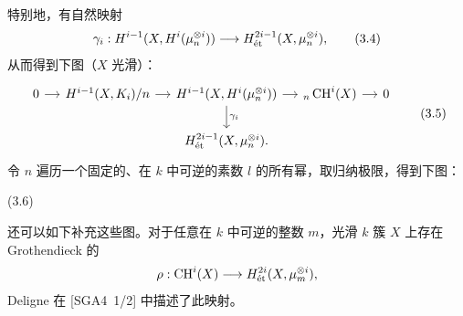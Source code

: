 特别地，有自然映射
\begin{equation*}
\gamma_i:H^{i-1}(X,H^i(\mu_n^{\otimes i}))\longrightarrow H^{2i-1}_{\mathrm{\acute et}}(X,\mu_n^{\otimes i}),\tag{3.4}
\end{equation*}
从而得到下图（$X$ 光滑）：
\begin{equation*}
\begin{tikzcd}[ampersand replacement=\&,column sep=small]
0 \arrow[r] \& H^{i-1}(X,\mathcal K_i)/n \arrow[r] \& H^{i-1}(X,\mathcal H^i(\mu_n^{\otimes i})) \arrow[r] \arrow[d,"{\gamma_i}"] \& {}_n\CH^i(X) \arrow[r] \&0\\
\&\& H^{2i-1}_{\et}(X,\mu_n^{\otimes i}).\&\&
\end{tikzcd}\tag{3.5}
\end{equation*}
令 $n$ 遍历一个固定的、在 $k$ 中可逆的素数 $l$ 的所有幂，取归纳极限，得到下图：
\begin{center}
\hfill\textup{(3.6)}
\end{center}

还可以如下补充这些图。对于任意在 $k$ 中可逆的整数 $m$，光滑 $k$ 簇 $X$ 上存在 Grothendieck 的
\[
\rho:\operatorname{CH}^i(X)\longrightarrow H^{2i}_{\mathrm{\acute et}}(X,\mu_m^{\otimes i}),
\]
Deligne 在 [SGA4~1/2] 中描述了此映射。

